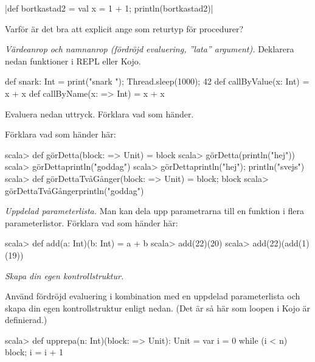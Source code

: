 \Subtask {}

\Subtask {}

\Subtask {}

\Subtask {}

\Subtask {}

\Subtask \code|def bortkastad2 = {val x = 1 + 1}; println(bortkastad2)|

\Subtask\Pen Varför är det bra att explicit ange  som returtyp för procedurer?


\Task \emph{Värdeanrop och namnanrop (fördröjd evaluering, ''lata'' argument).} Deklarera nedan funktioner i REPL eller Kojo.

\begin{Code}
def snark: Int = {print("snark "); Thread.sleep(1000); 42}
def callByValue(x: Int) = x + x
def callByName(x: => Int) = x + x
\end{Code}

Evaluera nedan uttryck. Förklara vad som händer.

\Subtask {}

\Subtask {}

\Subtask {}

\Subtask {}

\Subtask {}

\Subtask {}


\Subtask Förklara vad som händer här:
\begin{REPL}
scala> def görDetta(block: => Unit) = block
scala> görDetta(println("hej"))
scala> görDetta{println("goddag")}
scala> görDetta{println("hej"); println("svejs")}
scala> def görDettaTvåGånger(block: => Unit) = {block; block}
scala> görDettaTvåGånger{println("goddag")}
\end{REPL}


\Task \emph{Uppdelad parameterlista.} Man kan dela upp parametrarna till en funktion i flera parameterlistor. Förklara vad som händer här:
\begin{REPL}
scala> def add(a: Int)(b: Int) = a + b
scala> add(22)(20)
scala> add(22)(add(1)(19))
\end{REPL}


\Task \emph{Skapa din egen kontrollstruktur.}

\Subtask Använd fördröjd evaluering i kombination med en uppdelad parameterlista och skapa din egen kontrollstruktur enligt nedan. (Det är så här som loopen  i Kojo är definierad.)
\begin{REPL}
scala> def upprepa(n: Int)(block: => Unit): Unit = {
         var i = 0
         while (i < n) {block; i = i + 1}
       }
\end{REPL}

